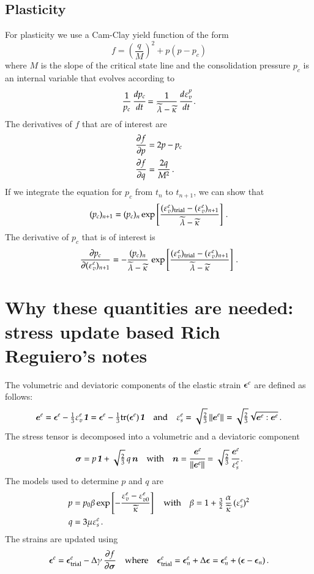 \documentclass[twoside,10pt,a4paper]{article}
\begin{document}
\subsection{Plasticity}
For plasticity we use a Cam-Clay yield function of the form
\[
   f = \left(\frac{q}{M}\right)^2 + p(p-p_c) 
\]
where $M$ is the slope of the critical state line and the consolidation pressure $p_c$ is an internal variable that 
evolves according to 
\[
   \frac{1}{p_c}\,\Deriv{p_c}{t} = \frac{1}{\lambdatilde - \kappatilde}\,\Deriv{\Ve^p_v}{t} \,.
\]
The derivatives of $f$ that are of interest are
\[
   \Bal
     \Partial{f}{p} & = 2p - p_c \\
     \Partial{f}{q} & = \frac{2q}{M^2} \,.
   \Eal
\]
If we integrate the equation for $p_c$ from $t_{n}$ to $t_{n+1}$, we can show that
\[
   (p_c)_{n+1} = (p_c)_n \exp\left[\frac{(\Ve_v^e)_\Trial - (\Ve_v^e)_{n+1}}{\lambdatilde - \kappatilde}\right] \,.
\]
The derivative of $p_c$ that is of interest is
\[
   \Partial{p_c}{(\Ve_v^e)_{n+1}} = -\frac{(p_c)_n}{\lambdatilde-\kappatilde}\,\exp\left[\frac{(\Ve^e_v)_\Trial - (\Ve_v^e)_{n+1}}{\lambdatilde-\kappatilde}\right] \,.
\]

\section{Why these quantities are needed: stress update based Rich Reguiero's notes}
The volumetric and deviatoric components of the elastic strain $\Beps^e$ are defined
as follows:
\[
   \BeT^e = \Beps^e - \tfrac{1}{3}\Ve^e_v\,\Bone = \Beps^e - \tfrac{1}{3}\Tr(\Beps^e)\,\Bone
   \quad \Tand \quad
   \Ve^e_s = \sqrt{\tfrac{2}{3}}\Norm{\BeT^e}{}  = \sqrt{\tfrac{2}{3}}\sqrt{\BeT^e:\BeT^e} \,.
\]
The stress tensor is decomposed into a volumetric and a deviatoric component
\[
   \Bsig = p\,\Bone + \sqrt{\tfrac{2}{3}}\, q\, \BnT \quad \text{with} \quad
   \BnT = \cfrac{\BeT^e}{\Norm{\BeT^e}{}} = \sqrt{\tfrac{2}{3}}\, \cfrac{\BeT^e}{\Ve^e_s} \,.
\]
The models used to determine $p$ and $q$ are
\[
  \Bal
    p &= p_0\beta\exp\left[-\frac{\Ve^e_v - \Ve^e_{v0}}{\kappatilde}\right] \quad \text{with} \quad
     \beta = 1 + \tfrac{3}{2}\,\frac{\alpha}{\kappatilde}\,(\Ve^e_s)^2 \\
    q &= 3\mu\Ve^e_s \,.
  \Eal
\]
The strains are updated using
\[
  \Beps^e = \Beps^e_{\rm trial} - \Delta\gamma\,\Partial{f}{\Bsig}
  \quad \text{where} \quad \Beps^e_{\rm trial} = \Beps^e_n + \Delta\Beps
     = \Beps^e_n + (\Beps - \Beps_n) \,.
\]
\end{document}
